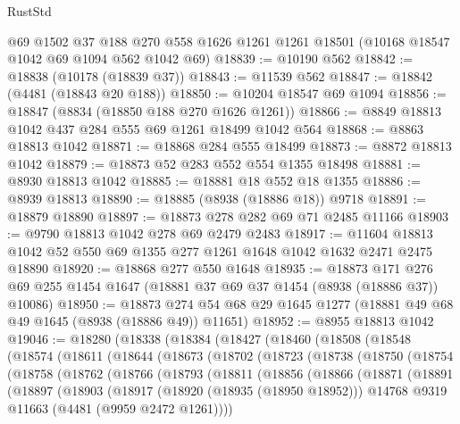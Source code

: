 \begin{lexlean}{RustStd}
\begin{coremodule}
    @69
    @1502
    @37
    @188
    @270
    @558
    @1626
    @1261
    @1261
    @18501
    (@10168 @18547 @1042 @69 @1094 @562 @1042 @69)
@18839 := @10190 @562
@18842 := @18838 (@10178 (@18839 @37))
@18843 := @11539 @562
@18847 := @18842 (@4481 (@18843 @20 @188))
@18850 := @10204 @18547 @69 @1094
@18856 := @18847 (@8834 (@18850 @188 @270 @1626 @1261))
@18866 := @8849 @18813 @1042 @437 @284 @555 @69 @1261 @18499 @1042 @564
@18868 := @8863 @18813 @1042
@18871 := @18868 @284 @555 @18499
@18873 := @8872 @18813 @1042
@18879 := @18873 @52 @283 @552 @554 @1355 @18498
@18881 := @8930 @18813 @1042
@18885 := @18881 @18 @552 @18 @1355
@18886 := @8939 @18813
@18890 := @18885 (@8938 (@18886 @18)) @9718
@18891 := @18879 @18890
@18897 := @18873 @278 @282 @69 @71 @2485 @11166
@18903 := @9790 @18813 @1042 @278 @69 @2479 @2483
@18917 := @11604 @18813 @1042 @52 @550 @69 @1355 @277 @1261 @1648 @1042 @1632 @2471 @2475 @18890
@18920 := @18868 @277 @550 @1648
@18935 := @18873
    @171
    @276
    @69
    @255
    @1454
    @1647
    (@18881 @37 @69 @37 @1454 (@8938 (@18886 @37)) @10086)
@18950 := @18873 @274 @54 @68 @29 @1645 @1277 (@18881 @49 @68 @49 @1645 (@8938 (@18886 @49)) @11651)
@18952 := @8955 @18813 @1042
@19046 := @18280
    (@18338
      (@18384
        (@18427
          (@18460
            (@18508
              (@18548
                (@18574
                  (@18611
                    (@18644
                      (@18673
                        (@18702
                          (@18723
                            (@18738
                              (@18750
                                (@18754
                                  (@18758
                                    (@18762
                                      (@18766
                                        (@18793
                                          (@18811
                                            (@18856
                                              (@18866
                                                (@18871
                                                  (@18891
                                                    (@18897
                                                      (@18903
                                                        (@18917
                                                          (@18920 (@18935 (@18950 @18952)))
                                                          @14768
                                                          @9319
                                                          @11663
                                                          (@4481 (@9959 @2472 @1261))))

\end{coremodule}
\end{lexlean}
